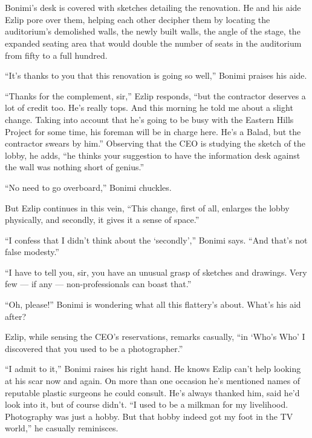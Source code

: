 \documentclass[twoside,11pt,openany]{book}
\begin{document}
\chapter{}

Bonimi's desk is covered{ }with sketches detailing the renovation. He and his aide Ezlip pore over them,
helping each other decipher them by locating the auditorium's demolished walls, the newly built walls, the angle of the
stage, the expanded seating area that would double the number of seats in the auditorium from fifty to a
full{ }hundred.

``It's thanks to you that this renovation is going so well,'' Bonimi{ }praises his aide.

``Thanks for the complement, sir,'' Ezlip responds, ``but the contractor deserves
a lot of credit too. He's really tops. And this morning he told me about a slight change. Taking into account that he's
going to be busy with the Eastern Hills Project for some time, his foreman will be in charge here.  He's a Balad, but
the contractor swears{ }by him.'' Observing that the CEO is studying the sketch of the
lobby, he adds, ``he thinks your suggestion to{ }have the information desk against the
wall was nothing short of genius.''

``No need to go overboard,'' Bonimi chuckles.

But Ezlip continues in this vein, ``This change, first of all, enlarges the lobby physically, and secondly,
it gives it a sense of space.''

``I confess that I didn't think about the `secondly','' Bonimi says. ``And that's
not false modesty.''

``I have to tell you, sir, you have an unusual grasp of sketches and drawings. Very few --- if any ---
non-professionals can boast that.''

``Oh, please!'' Bonimi is wondering what all this flattery's about. What's his aid after?

Ezlip, while sensing the CEO's reservations, remarks casually, ``in `Who's Who' I discovered that you used
to be a photographer.''

``I admit to it,'' Bonimi raises his right hand. He knows Ezlip can't help looking at his scar
now and again. On more than one occasion he's mentioned names of reputable{ }plastic surgeons he could
consult. He's always thanked him, said he'd look into it, but of course didn't. ``I used to be a milkman
for my livelihood. Photography was just a hobby. But that hobby indeed got my foot in the TV world,'' he
casually reminisces.
\end{document}
